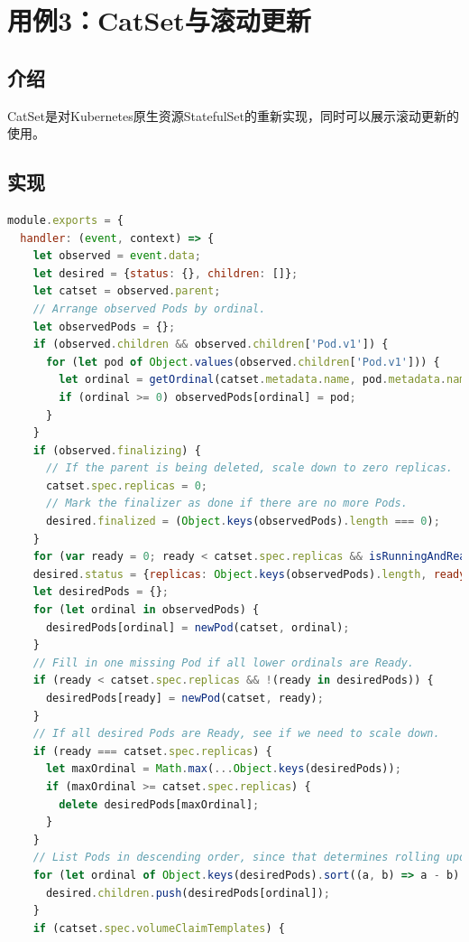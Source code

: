 \documentclass[macfonts,master]{njuthesis}
\begin{document}
\section{用例3：CatSet与滚动更新}
\subsection{介绍}
CatSet是对Kubernetes原生资源StatefulSet的重新实现，同时可以展示滚动更新的使用。
\subsection{实现}

\begin{lstlisting}[language=JavaScript,caption=生成Pod和PVC,label=listing:catset]
module.exports = {
  handler: (event, context) => {
    let observed = event.data;
    let desired = {status: {}, children: []};
    let catset = observed.parent;
    // Arrange observed Pods by ordinal.
    let observedPods = {};
    if (observed.children && observed.children['Pod.v1']) {
      for (let pod of Object.values(observed.children['Pod.v1'])) {
        let ordinal = getOrdinal(catset.metadata.name, pod.metadata.name);
        if (ordinal >= 0) observedPods[ordinal] = pod;
      }
    }
    if (observed.finalizing) {
      // If the parent is being deleted, scale down to zero replicas.
      catset.spec.replicas = 0;
      // Mark the finalizer as done if there are no more Pods.
      desired.finalized = (Object.keys(observedPods).length === 0);
    }
    for (var ready = 0; ready < catset.spec.replicas && isRunningAndReady(observedPods[ready]); ready++) ;
    desired.status = {replicas: Object.keys(observedPods).length, readyReplicas: ready};
    let desiredPods = {};
    for (let ordinal in observedPods) {
      desiredPods[ordinal] = newPod(catset, ordinal);
    }
    // Fill in one missing Pod if all lower ordinals are Ready.
    if (ready < catset.spec.replicas && !(ready in desiredPods)) {
      desiredPods[ready] = newPod(catset, ready);
    }
    // If all desired Pods are Ready, see if we need to scale down.
    if (ready === catset.spec.replicas) {
      let maxOrdinal = Math.max(...Object.keys(desiredPods));
      if (maxOrdinal >= catset.spec.replicas) {
        delete desiredPods[maxOrdinal];
      }
    }
    // List Pods in descending order, since that determines rolling update order.
    for (let ordinal of Object.keys(desiredPods).sort((a, b) => a - b).reverse()) {
      desired.children.push(desiredPods[ordinal]);
    }
    if (catset.spec.volumeClaimTemplates) {

\end{lstlisting}
\end{document}
